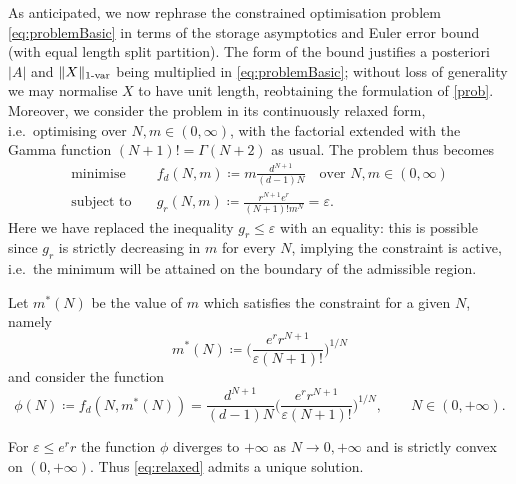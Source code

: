 \documentclass{article}
\newcommand{\var}[1]{{#1 \mathchar"2D \mathrm{var}}}
\def\eps{\varepsilon}
\numberwithin{equation}{section}
\theoremstyle{definition}
\theoremstyle{remark}
\begin{document}
As anticipated, we now rephrase the constrained optimisation problem \eqref{eq:problemBasic} in terms of the storage asymptotics and Euler error bound (with equal length split partition). The form of the bound justifies a posteriori $|A|$ and $\|X\|_{\var{1}}$ being multiplied in \eqref{eq:problemBasic}; without loss of generality we may normalise $X$ to have unit length, reobtaining the formulation of \autoref{prob}. Moreover, we consider the problem in its continuously relaxed form, i.e.\ optimising over $N, m \in (0,\infty)$, with the factorial extended with the Gamma function $(N+1)! = \Gamma(N+2)$ as usual. The problem thus becomes
\begin{equation}\label{eq:relaxed}
\begin{split}
	\text{minimise}\quad &f_d(N,m) \coloneqq m\frac{d^{N+1}}{(d-1)N} \quad \text{over } N, m \in (0,\infty) \\
	\text{subject to}\quad &g_r(N, m) \coloneqq \frac{r^{N+1}e^r}{(N+1)! m^N} = \eps.
\end{split}
\end{equation}
Here we have replaced the inequality $g_r \leq \eps$ with an equality: this is possible since $g_r$ is strictly decreasing in $m$ for every $N$, implying the constraint is active, i.e.\ the minimum will be attained on the boundary of the admissible region.

Let $m^*(N)$ be the value of $m$ which satisfies the constraint for a given $N$, namely
\begin{equation}
m^*(N) \coloneqq \bigg(\frac{e^r r^{N+1}}{\eps (N+1)!} \bigg)^{1/N}
\end{equation}
and consider the function
\begin{equation}\label{eq:phisub}
\phi(N) \coloneqq f_d(N, m^*(N)) = \frac{d^{N+1}}{(d-1)N} \bigg(\frac{e^r r^{N+1}}{\eps (N+1)!} \bigg)^{1/N}, \qquad N \in (0,+\infty).
\end{equation}

\begin{lemma}\label{eq:minphi}
For $\eps \leq e^r r$ the function $\phi$ diverges to $+\infty$ as $N \to 0, +\infty$ and is strictly convex on $(0,+\infty)$. Thus \eqref{eq:relaxed} admits a unique solution.
\end{lemma}
\end{document}
